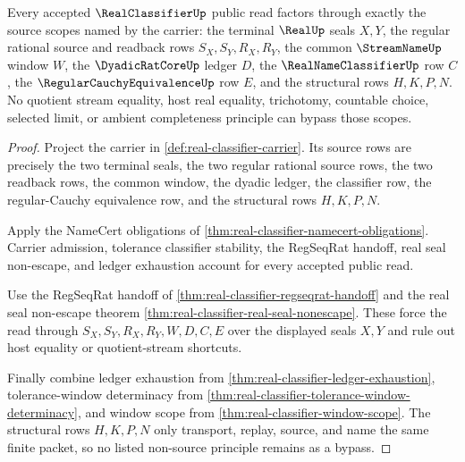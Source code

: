 \begin{theorem}
\label{thm:real-classifier-source-scope}
Every accepted $\RealClassifierUp$ public read factors through exactly the source scopes named by the carrier: the terminal $\RealUp$ seals $X,Y$, the regular rational source and readback rows $S_X,S_Y,R_X,R_Y$, the common $\StreamNameUp$ window $W$, the $\DyadicRatCoreUp$ ledger $D$, the $\RealNameClassifierUp$ row $C$, the $\RegularCauchyEquivalenceUp$ row $E$, and the structural rows $H,K,P,N$. No quotient stream equality, host real equality, trichotomy, countable choice, selected limit, or ambient completeness principle can bypass those scopes.
\end{theorem}
\begin{proof}
Project the carrier in \autoref{def:real-classifier-carrier}. Its source rows are precisely the two terminal seals, the two regular rational source rows, the two readback rows, the common window, the dyadic ledger, the classifier row, the regular-Cauchy equivalence row, and the structural rows $H,K,P,N$.

Apply the NameCert obligations of \autoref{thm:real-classifier-namecert-obligations}. Carrier admission, tolerance classifier stability, the RegSeqRat handoff, real seal non-escape, and ledger exhaustion account for every accepted public read.

Use the RegSeqRat handoff of \autoref{thm:real-classifier-regseqrat-handoff} and the real seal non-escape theorem \autoref{thm:real-classifier-real-seal-nonescape}. These force the read through $S_X,S_Y,R_X,R_Y,W,D,C,E$ over the displayed seals $X,Y$ and rule out host equality or quotient-stream shortcuts.

Finally combine ledger exhaustion from \autoref{thm:real-classifier-ledger-exhaustion}, tolerance-window determinacy from \autoref{thm:real-classifier-tolerance-window-determinacy}, and window scope from \autoref{thm:real-classifier-window-scope}. The structural rows $H,K,P,N$ only transport, replay, source, and name the same finite packet, so no listed non-source principle remains as a bypass.
\end{proof}

